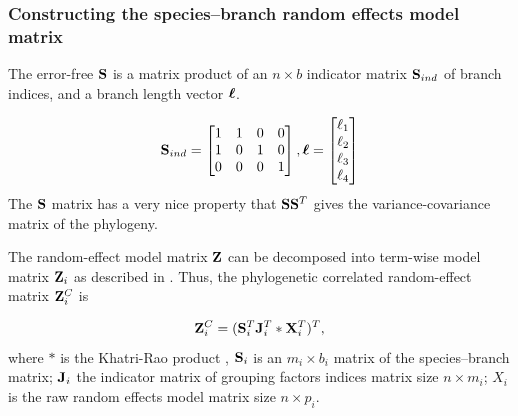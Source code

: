 \subsubsection*{Constructing the species--branch random effects model matrix}

The error-free ${\mathbf S}$ is a matrix product of an $n \times b$ indicator matrix ${\mathbf S}_{ind}$ of branch indices, and a branch length vector ${\boldsymbol \ell}$.

\begin{align}
{\mathbf S}_{ind} = \begin{bmatrix}
1 & 1 & 0 & 0 \\ 
1 & 0 & 1 & 0 \\ 
0 & 0 & 0 & 1
\end{bmatrix} , 
{\boldsymbol \ell} = \begin{bmatrix}
\ell_1 \\
\ell_2 \\
\ell_3 \\
\ell_4 
\end{bmatrix}
\label{eq:S}
\end{align}
The ${\mathbf S}$ matrix has a very nice property that ${\mathbf S} {\mathbf S}^T$ gives the variance-covariance matrix of the phylogeny. 

The random-effect model matrix ${\mathbf Z}$ can be decomposed into term-wise model matrix ${\mathbf Z}_{i}$ as described in \citet{bates2015fitting}.
Thus, the phylogenetic correlated random-effect matrix ${\mathbf Z}^{C}_{i}$ is

\begin{equation}
{\mathbf Z}^{C}_{i} = ({\mathbf S}^{T}_{i}{\mathbf J}^{T}_{i} \ast {\mathbf X}^{T}_{i})^{T}, \label{eq:ZC}
\end{equation}
where $\ast$ is the Khatri-Rao product \citep{khatri1968solutions}, ${\mathbf S}_{i}$ is an $m_{i} \times b_{i}$ matrix of the species--branch matrix; ${\mathbf J}_{i}$ the indicator matrix of grouping factors indices matrix size $n \times m_{i}$; $X_{i}$ is the raw random effects model matrix size $n \times p_{i}$. 


